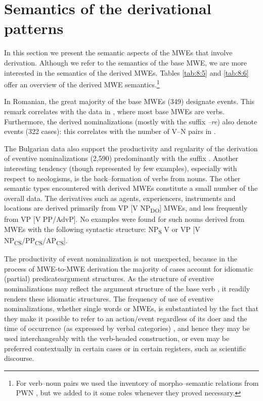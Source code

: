 \documentclass[output=paper]{langsci/langscibook}
\begin{document}
\section{Semantics of the derivational patterns}
\label{section7}

In this section we present the semantic aspects of the MWEs that involve derivation. Although we refer to the semantics of the base MWE, we
are more interested in the semantics of the derived MWEs. Tables \ref{tab:8:5} and  \ref{tab:8:6}
offer an overview of the derived MWE semantics.\footnote{
For verb–noun pairs we used the inventory of
morpho–semantic relations from PWN \citep{fellbaum2009}, but we added
to it some roles whenever they proved necessary.}

In Romanian, the great majority of the base MWEs (349) designate
events. This remark correlates with the data in , where most
base MWEs are verbs. Furthermore, the derived nominalizations (mostly
with the suffix \textit{–re}) also denote events (322 cases): this correlates
with the number of V–N pairs in \nolinebreak {}.

The Bulgarian data also support the productivity and regularity of the
derivation of eventive nominalizations (2,590) predominantly with the
suffix . Another interesting tendency (though represented by few
examples), especially with respect to neologisms, is the back–formation
of verbs from nouns. The other semantic types encountered with derived
MWEs constitute a small number of the overall data. The derivatives
such as agents, experiencers, instruments and locations are derived
primarily from VP [V NP\textsubscript{DO}] MWEs, and less frequently
from VP [V PP/AdvP]. No examples were found for such nouns derived
from MWEs with the following syntactic structure: NP\textsubscript{S }V
or VP [V
NP\textsubscript{CS}/PP\textsubscript{CS}/AP\textsubscript{CS}].

 The productivity of event nominalization is not unexpected, because in the
process of MWE-to-MWE derivation the majority of cases account for
idiomatic (partial) predicate\textendash argument structures. As the structure of
eventive nominalizations may reflect the argument structure of the base
verb \citep{grimshaw1990}, it readily renders these idiomatic structures. The frequency of use of eventive nominalizations, whether single words
or MWEs, is substantiated by the fact that they make it possible to
refer to an action/event regardless of its doer and the time of
occurrence (as expressed by verbal categories) \citep{pometkova2006}, and
hence they may be used interchangeably with the verb-headed
construction, or even may be preferred contextually in certain cases or
in certain registers, such as scientific discourse.
\end{document}
